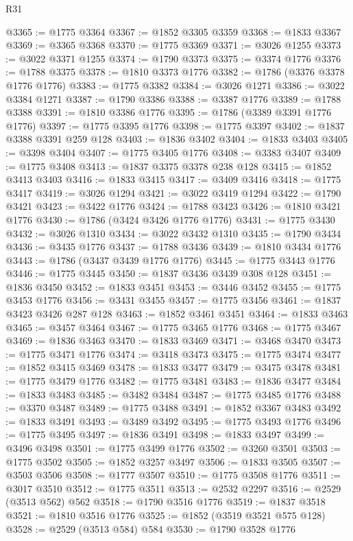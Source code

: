 \begin{lexlean}{R31}
\begin{coremodule}
@3365 := @1775 @3364
@3367 := @1852 @3305 @3359
@3368 := @1833 @3367
@3369 := @3365 @3368
@3370 := @1775 @3369
@3371 := @3026 @1255
@3373 := @3022 @3371 @1255
@3374 := @1790 @3373
@3375 := @3374 @1776
@3376 := @1788 @3375
@3378 := @1810 @3373 @1776
@3382 := @1786 (@3376 @3378 @1776 @1776)
@3383 := @1775 @3382
@3384 := @3026 @1271
@3386 := @3022 @3384 @1271
@3387 := @1790 @3386
@3388 := @3387 @1776
@3389 := @1788 @3388
@3391 := @1810 @3386 @1776
@3395 := @1786 (@3389 @3391 @1776 @1776)
@3397 := @1775 @3395 @1776
@3398 := @1775 @3397
@3402 := @1837 @3388 @3391 @259 @128
@3403 := @1836 @3402
@3404 := @1833 @3403
@3405 := @3398 @3404
@3407 := @1775 @3405 @1776
@3408 := @3383 @3407
@3409 := @1775 @3408
@3413 := @1837 @3375 @3378 @238 @128
@3415 := @1852 @3413 @3403
@3416 := @1833 @3415
@3417 := @3409 @3416
@3418 := @1775 @3417
@3419 := @3026 @1294
@3421 := @3022 @3419 @1294
@3422 := @1790 @3421
@3423 := @3422 @1776
@3424 := @1788 @3423
@3426 := @1810 @3421 @1776
@3430 := @1786 (@3424 @3426 @1776 @1776)
@3431 := @1775 @3430
@3432 := @3026 @1310
@3434 := @3022 @3432 @1310
@3435 := @1790 @3434
@3436 := @3435 @1776
@3437 := @1788 @3436
@3439 := @1810 @3434 @1776
@3443 := @1786 (@3437 @3439 @1776 @1776)
@3445 := @1775 @3443 @1776
@3446 := @1775 @3445
@3450 := @1837 @3436 @3439 @308 @128
@3451 := @1836 @3450
@3452 := @1833 @3451
@3453 := @3446 @3452
@3455 := @1775 @3453 @1776
@3456 := @3431 @3455
@3457 := @1775 @3456
@3461 := @1837 @3423 @3426 @287 @128
@3463 := @1852 @3461 @3451
@3464 := @1833 @3463
@3465 := @3457 @3464
@3467 := @1775 @3465 @1776
@3468 := @1775 @3467
@3469 := @1836 @3463
@3470 := @1833 @3469
@3471 := @3468 @3470
@3473 := @1775 @3471 @1776
@3474 := @3418 @3473
@3475 := @1775 @3474
@3477 := @1852 @3415 @3469
@3478 := @1833 @3477
@3479 := @3475 @3478
@3481 := @1775 @3479 @1776
@3482 := @1775 @3481
@3483 := @1836 @3477
@3484 := @1833 @3483
@3485 := @3482 @3484
@3487 := @1775 @3485 @1776
@3488 := @3370 @3487
@3489 := @1775 @3488
@3491 := @1852 @3367 @3483
@3492 := @1833 @3491
@3493 := @3489 @3492
@3495 := @1775 @3493 @1776
@3496 := @1775 @3495
@3497 := @1836 @3491
@3498 := @1833 @3497
@3499 := @3496 @3498
@3501 := @1775 @3499 @1776
@3502 := @3260 @3501
@3503 := @1775 @3502
@3505 := @1852 @3257 @3497
@3506 := @1833 @3505
@3507 := @3503 @3506
@3508 := @1777 @3507
@3510 := @1775 @3508 @1776
@3511 := @3017 @3510
@3512 := @1775 @3511
@3513 := @2532 @2297
@3516 := @2529 (@3513 @562) @562
@3518 := @1790 @3516 @1776
@3519 := @1837 @3518
@3521 := @1810 @3516 @1776
@3525 := @1852 (@3519 @3521 @575 @128)
@3528 := @2529 (@3513 @584) @584
@3530 := @1790 @3528 @1776

\end{coremodule}
\end{lexlean}
